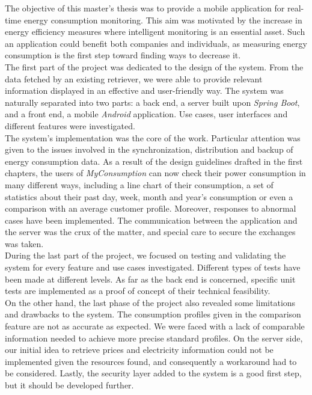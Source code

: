 \documentclass[a4paper, oneside, 11pt]{book}
\begin{document}
The objective of this master’s thesis was to provide a mobile application for real-time energy consumption monitoring. This aim was motivated by the increase in energy efficiency measures where intelligent monitoring is an essential asset. Such an application could benefit both companies and individuals, as measuring energy consumption is the first step toward finding ways to decrease it.\\

The first part of the project was dedicated to the design of the system. From the data fetched by an existing retriever, we were able to provide relevant information displayed in an effective and user-friendly way. The system was naturally separated into two parts: a back end, a server built upon \textit{Spring Boot}, and a front end, a mobile \textit{Android} application. Use cases, user interfaces and different features were investigated.\\

The system’s implementation was the core of the work. Particular attention was given  to the issues involved in the synchronization, distribution and backup of energy consumption data. As a result of the design guidelines drafted in the first chapters, the users of \textit{MyConsumption} can now check their power consumption in many different ways, including a line chart of their consumption, a set of statistics about their past day, week, month and year’s consumption or even a comparison with an average customer profile. Moreover, responses to abnormal cases have been implemented. The communication between the application and the server was the crux of the matter, and special care to secure the exchanges was taken.\\

During the last part of the project, we focused on testing and validating the system for every feature and use cases investigated. Different types of tests have been made at different levels. As far as the back end is concerned, specific unit tests are implemented as a proof of concept of their technical feasibility.\\

On the other hand, the last phase of the project also revealed some limitations and drawbacks to the system. The consumption profiles given in the comparison feature are not as accurate as expected. We were faced with a lack of comparable information needed to achieve more precise standard profiles. On the server side, our initial idea to retrieve prices and electricity information could not be implemented given the resources found, and consequently a workaround had to be considered. Lastly, the security layer added to the system is a good first step, but it should be developed further. \\
\end{document}
